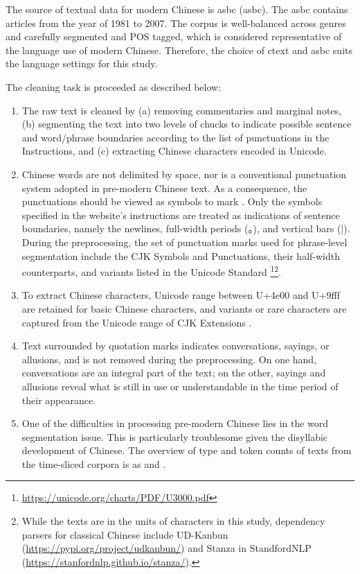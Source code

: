 The source of textual data for modern Chinese is \acrlong{asbc} (\acrshort{asbc}). The \gls{asbc} contains articles from the year of 1981 to 2007. The corpus is well-balanced across genres and carefully segmented and POS tagged, which is considered representative of the language use of modern Chinese. Therefore, the choice of \gls{ctext} and \gls{asbc} suits the language settings for this study.

The cleaning task is proceeded as described below:

\begin{enumerate}[label={(\arabic*)}]
    \item The raw text is cleaned by (a) removing commentaries and marginal notes, (b) segmenting the text into two levels of chucks to indicate possible sentence and word/phrase boundaries according to the list of punctuations in the Instructions, and (c) extracting Chinese characters encoded in Unicode.
    \item Chinese words are not delimited by space, nor is a conventional punctuation system adopted in pre-modern Chinese text. As a consequence, the punctuations  should be viewed as symbols to mark . Only the symbols specified in the website's instructions are treated as indications of sentence boundaries, namely the newlines, full-width periods (。), and vertical bars (|). During the preprocessing, the set of punctuation marks used for phrase-level segmentation include the CJK Symbols and Punctuations, their half-width counterparts, and variants listed in the Unicode Standard \footnote{\url{https://unicode.org/charts/PDF/U3000.pdf}}\footnote{While the texts are in the units of characters in this study, dependency parsers for classical Chinese include UD-Kanbun \parencite{yasuoka2019universal} (\url{https://pypi.org/project/udkanbun/}) and Stanza in StandfordNLP \parencite{qi2020stanza}(\url{https://stanfordnlp.github.io/stanza/}).}.
    \item To extract Chinese characters, Unicode range between U+4e00 and U+9fff are retained for basic Chinese characters, and variants or rare characters are captured from the Unicode range of CJK Extensions \parencite{moran2018unicode}.
    \item Text surrounded by quotation marks indicates conversations, sayings, or allusions, and is not removed during the preprocessing. On one hand, conversations are an integral part of the text; on the other, sayings and allusions reveal what is still in use or understandable in the time period of their appearance.
    \item One of the difficulties in processing pre-modern Chinese lies in the word segmentation issue. This is particularly troublesome given the disyllabic development of Chinese. The overview of type and token counts of texts from the time-sliced corpora is as  and .
\end{enumerate}

